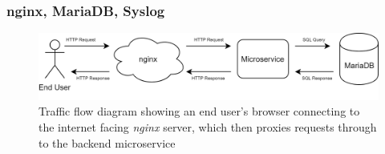 \subsubsection{nginx, MariaDB, Syslog}
\begin{figure}[H]
    \centering
    \includegraphics[width=\textwidth]{Images/nginx_proxy_flow.png}
    \caption{Traffic flow diagram showing an end user's browser connecting to the internet facing \textit{nginx} server, which then proxies requests through to the backend microservice}
\end{figure}


